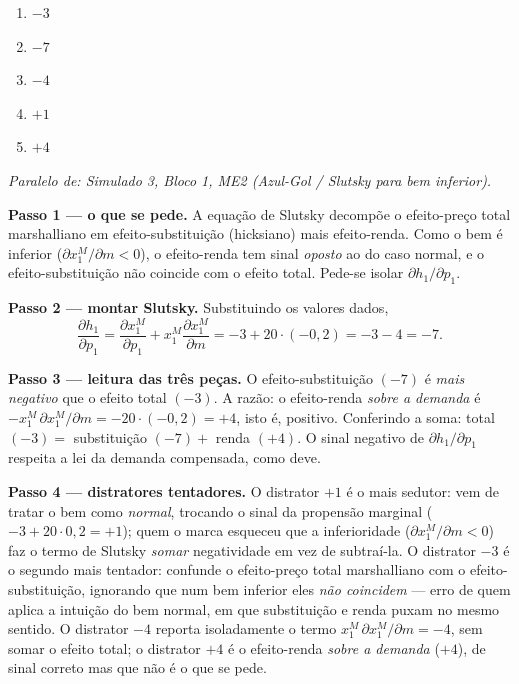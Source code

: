 \begin{enumerate}[label=\Alph*., leftmargin=3.2em, itemsep=0.15em, topsep=0.2em]
  \item $-3$
  \item $-7$
  \item $-4$
  \item $+1$
  \item $+4$
\end{enumerate}
\begin{solucao}
{\footnotesize\textit{Paralelo de: Simulado 3, Bloco 1, ME2 (Azul-Gol / Slutsky para bem inferior).}}\par\vspace{0.2em}
\textbf{Passo 1 --- o que se pede.} A equação de Slutsky decompõe o efeito-preço total marshalliano em efeito-substituição (hicksiano) mais efeito-renda. Como o bem é inferior ($\partial x_1^{M}/\partial m<0$), o efeito-renda tem sinal \emph{oposto} ao do caso normal, e o efeito-substituição não coincide com o efeito total. Pede-se isolar $\partial h_1/\partial p_1$.

\textbf{Passo 2 --- montar Slutsky.} Substituindo os valores dados,
\[
\frac{\partial h_1}{\partial p_1}=\frac{\partial x_1^{M}}{\partial p_1}+x_1^{M}\frac{\partial x_1^{M}}{\partial m}=-3+20\cdot(-0{,}2)=-3-4=-7.
\]

\textbf{Passo 3 --- leitura das três peças.} O efeito-substituição $(-7)$ é \emph{mais negativo} que o efeito total $(-3)$. A razão: o efeito-renda \emph{sobre a demanda} é $-x_1^{M}\,\partial x_1^{M}/\partial m=-20\cdot(-0{,}2)=+4$, isto é, positivo. Conferindo a soma: total $(-3)=$ substituição $(-7)+$ renda $(+4)$. O sinal negativo de $\partial h_1/\partial p_1$ respeita a lei da demanda compensada, como deve.

\textbf{Passo 4 --- distratores tentadores.} O distrator $+1$ é o mais sedutor: vem de tratar o bem como \emph{normal}, trocando o sinal da propensão marginal ($-3+20\cdot 0{,}2=+1$); quem o marca esqueceu que a inferioridade ($\partial x_1^{M}/\partial m<0$) faz o termo de Slutsky \emph{somar} negatividade em vez de subtraí-la. O distrator $-3$ é o segundo mais tentador: confunde o efeito-preço total marshalliano com o efeito-substituição, ignorando que num bem inferior eles \emph{não coincidem} --- erro de quem aplica a intuição do bem normal, em que substituição e renda puxam no mesmo sentido. O distrator $-4$ reporta isoladamente o termo $x_1^{M}\,\partial x_1^{M}/\partial m=-4$, sem somar o efeito total; o distrator $+4$ é o efeito-renda \emph{sobre a demanda} ($+4$), de sinal correto mas que não é o que se pede.


\end{solucao}
